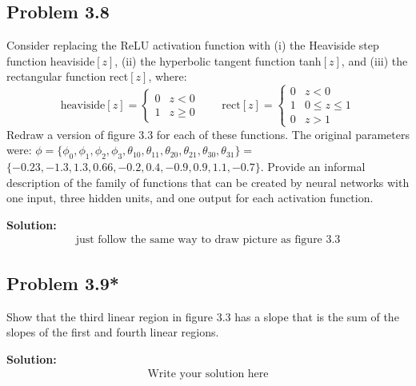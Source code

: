 \documentclass{article}
\begin{document}
    \subsection*{Problem 3.8}
    Consider replacing the ReLU activation function with (i) the Heaviside step function heaviside$[z]$, (ii) the hyperbolic tangent function tanh$[z]$, and (iii) the rectangular function rect$[z]$, where:
    \begin{equation}
        \text{heaviside}[z] = \begin{cases}
            0 & z < 0 \\
            1 & z \geq 0
        \end{cases}
        \qquad
        \text{rect}[z] = \begin{cases}
            0 & z < 0 \\
            1 & 0 \leq z \leq 1 \\
            0 & z > 1
        \end{cases}
        \tag{3.15}
    \end{equation}
    Redraw a version of figure 3.3 for each of these functions. The original parameters were: 
    $\phi = \{\phi_0, \phi_1, \phi_2, \phi_3, \theta_{10}, \theta_{11}, \theta_{20}, \theta_{21}, \theta_{30}, \theta_{31}\} =$ \\
    $\{-0.23, -1.3, 1.3, 0.66, -0.2, 0.4, -0.9, 0.9, 1.1, -0.7\}$. Provide an informal description of the family of functions that can be created by neural networks with one input, three hidden units, and one output for each activation function.

        \vspace{1cm}
        \textbf{Solution:}
        \begin{align*}
            \text{just follow the same way to draw picture as figure 3.3}
        \end{align*}

    \subsection*{Problem 3.9*}
    Show that the third linear region in figure 3.3 has a slope that is the sum of the slopes of the first and fourth linear regions.

        \vspace{1cm}
        \textbf{Solution:}
        \begin{align*}
            \text{Write your solution here}
        \end{align*}
\end{document}
